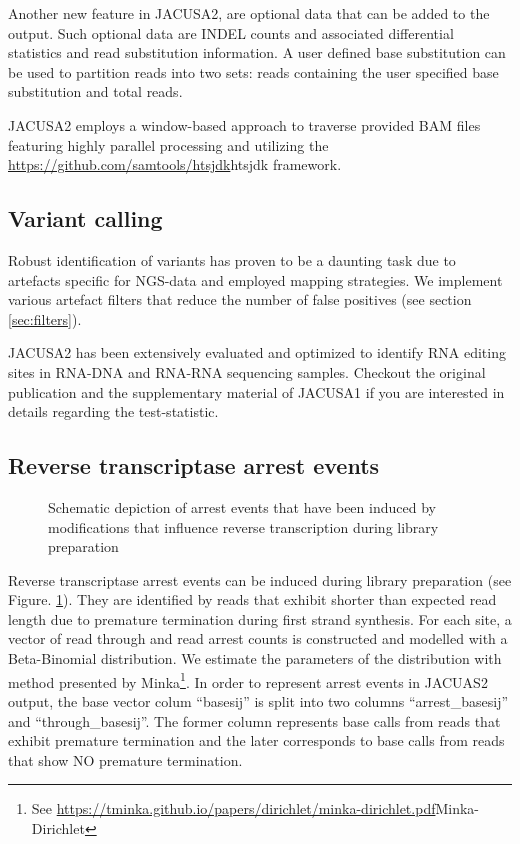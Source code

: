 \documentclass[10pt,a4paper]{article}
\begin{document}
Another new feature in JACUSA2, are optional data that can be added to the output.
Such optional data are INDEL counts and associated differential statistics and read substitution information.
A user defined base substitution can be used to partition reads into two sets: reads containing the 
user specified base substitution and total reads.

JACUSA2 employs a window-based approach to traverse provided BAM\cite{HengLi2009} files featuring highly 
parallel processing and utilizing the \url{https://github.com/samtools/htsjdk}{htsjdk} framework.
\subsection{Variant calling}
Robust identification of variants has proven to be a daunting task due to artefacts specific for 
NGS-data and employed mapping strategies. We implement various artefact filters that reduce the number 
of false positives (see section \ref{sec:filters}).

JACUSA2 has been extensively evaluated and optimized to identify RNA editing sites in RNA-DNA and
RNA-RNA sequencing samples. Checkout the original publication and the supplementary material of 
JACUSA1 \cite{Piechotta2017} if you are interested in details regarding the test-statistic.
\subsection{Reverse transcriptase arrest events}
\begin{figure}[ht]
  \centering
  \caption{Schematic depiction of arrest events that have been induced by modifications that influence 
  reverse transcription during library preparation}
  \label{fig:arrest_events}
\end{figure}
Reverse transcriptase arrest events can be induced during library preparation (see Figure. \ref{fig:arrest_events}).
They are identified by reads that exhibit shorter than expected read length due to premature termination 
during first strand synthesis. For each site, a vector of read through and read arrest counts is constructed 
and modelled with a Beta-Binomial distribution. We estimate the parameters of the distribution with 
method presented by Minka\footnote{See \url{https://tminka.github.io/papers/dirichlet/minka-dirichlet.pdf}{Minka-Dirichlet}}.
In order to represent arrest events in JACUAS2 output, the base vector colum ``basesij''  is split into 
two columns ``arrest\_basesij'' and ``through\_basesij''. The former column represents base calls from 
reads that exhibit premature termination and the later corresponds to base calls from reads that 
show NO premature termination.
\end{document}
